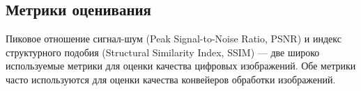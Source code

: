 \subsection{Метрики оценивания}\label{sect-4-3}

Пиковое отношение сигнал-шум (Peak Signal-to-Noise Ratio, PSNR) и индекс структурного подобия (Structural Similarity Index, SSIM) — две широко используемые метрики для оценки качества цифровых изображений. Обе метрики часто используются для оценки качества конвейеров обработки изображений.

